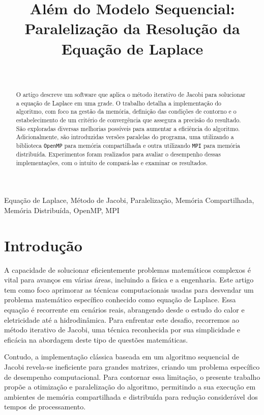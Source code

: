 \documentclass[conference]{IEEEtran}
\title{Além do Modelo Sequencial: Paralelização da Resolução da Equação de Laplace}
\author{
    \IEEEauthorblockN{Petro Cardoso}\\
    \IEEEauthorblockA{
        Departamento de Engenharia de Sistemas e Computação \\
        Universidade do Estado do Rio de Janeiro \\
        Rio de Janeiro, Brasil \\
        \texttt{Email: petrolcds@gmail.com}\\
    }
}
\begin{document}
\maketitle

\begin{abstract}
    O artigo descreve um software que aplica o método iterativo de Jacobi para solucionar a equação de Laplace em uma grade. O trabalho detalha a implementação do algoritmo, com foco na gestão da memória, definição das condições de contorno e o estabelecimento de um critério de convergência que assegura a precisão do resultado. São exploradas diversas melhorias possíveis para aumentar a eficiência do algoritmo. Adicionalmente, são introduzidas versões paralelas do programa, uma utilizando a biblioteca \texttt{OpenMP} para memória compartilhada e outra utilizando \texttt{MPI} para memória distribuída. Experimentos foram realizados para avaliar o desempenho dessas implementações, com o intuito de compará-las e examinar os resultados.
\end{abstract}

\begin{IEEEkeywords}
    Equação de Laplace, Método de Jacobi, Paralelização, Memória Compartilhada, Memória Distribuída, OpenMP, MPI
\end{IEEEkeywords}

\section{Introdução}
A capacidade de solucionar eficientemente problemas matemáticos complexos é vital para avanços em várias áreas, incluindo a física e a engenharia. Este artigo tem como foco aprimorar as técnicas computacionais usadas para desvendar um problema matemático específico conhecido como equação de Laplace. Essa equação é recorrente em cenários reais, abrangendo desde o estudo do calor e eletricidade até a hidrodinâmica. Para enfrentar este desafio, recorremos ao método iterativo de Jacobi, uma técnica reconhecida por sua simplicidade e eficácia na abordagem deste tipo de questões matemáticas.

Contudo, a implementação clássica baseada em um algoritmo sequencial de Jacobi revela-se ineficiente para grandes matrizes, criando um problema específico de desempenho computacional. Para contornar essa limitação, o presente trabalho propõe a otimização e paralelização do algoritmo, permitindo a sua execução em ambientes de memória compartilhada e distribuída para redução considerável dos tempos de processamento.
\end{document}

